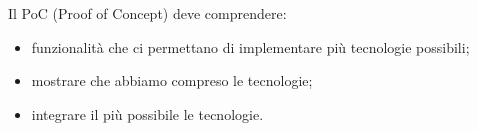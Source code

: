     \noindent Il PoC (Proof of Concept) deve comprendere:
    \begin{itemize}
        \item funzionalità che ci permettano di implementare più tecnologie possibili;
        \item mostrare che abbiamo compreso le tecnologie;
        \item integrare il più possibile le tecnologie.
    \end{itemize}




